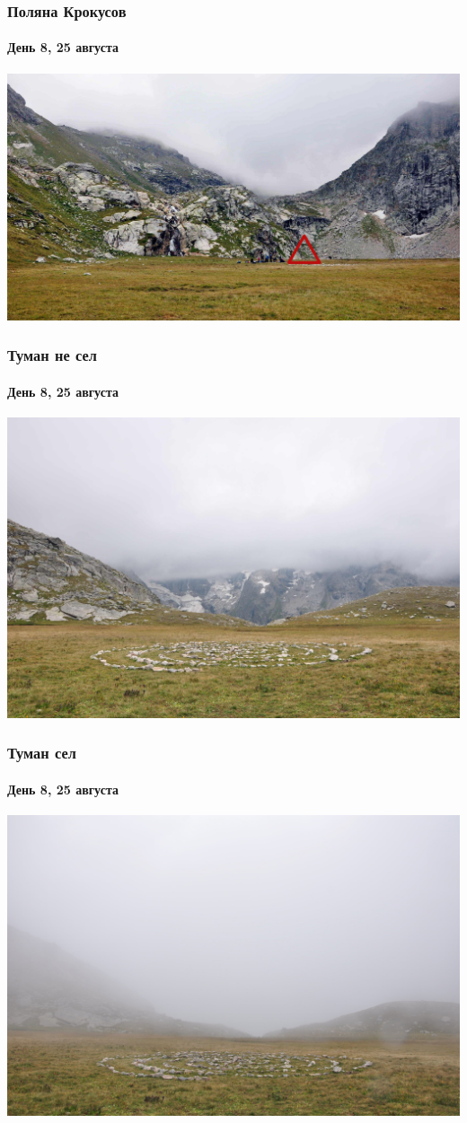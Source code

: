 \begin{frame}
	\frametitle{Поляна Крокусов}
	\framesubtitle{День 8, 25 августа}
	\centering
	\includegraphics[width=\textwidth]{../pics/DSC_0177}			
\end{frame}

\begin{frame}
	\frametitle{Туман \textbf{не} сел}
	\framesubtitle{День 8, 25 августа}
	\centering
	\includegraphics[width=\textwidth]{../pics/DSC_0179}			
\end{frame}

\begin{frame}
	\frametitle{Туман сел}
	\framesubtitle{День 8, 25 августа}
	\centering
	\includegraphics[width=\textwidth]{../pics/DSC_0181}			
\end{frame}

